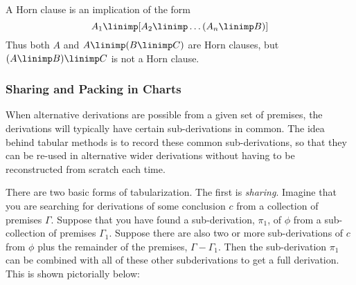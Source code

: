A Horn clause is an implication of the form
\[A_1 \linimp [A_2 \linimp \ldots (A_n \linimp B)]\]
Thus both $A$ and $A\linimp (B\linimp C)$ are Horn clauses, but
$(A\linimp B)\linimp C$ is not a Horn clause.


\subsubsection{Sharing and Packing in Charts}

When alternative derivations are possible from a given set of
premises, the derivations will typically have certain sub-derivations
in common.  The idea behind tabular methods is to record these
common sub-derivations, so that they can be re-used in alternative
wider derivations without having to be reconstructed from scratch each
time.

There are two basic forms of tabularization.  The first is
{\em sharing}.   Imagine that you are searching for derivations
of some conclusion $c$ from a collection of premises $\Gamma$.
Suppose that you have found a sub-derivation,
$\pi_1$, of $\phi$ from a sub-collection of premises $\Gamma_1$.
Suppose there are also two or more sub-derivations of $c$ from $\phi$ plus the 
remainder of the premises, $\Gamma - \Gamma_1$.
Then the sub-derivation $\pi_1$ can be combined with all of these
other subderivations to get a full derivation.  This is shown
pictorially below:

